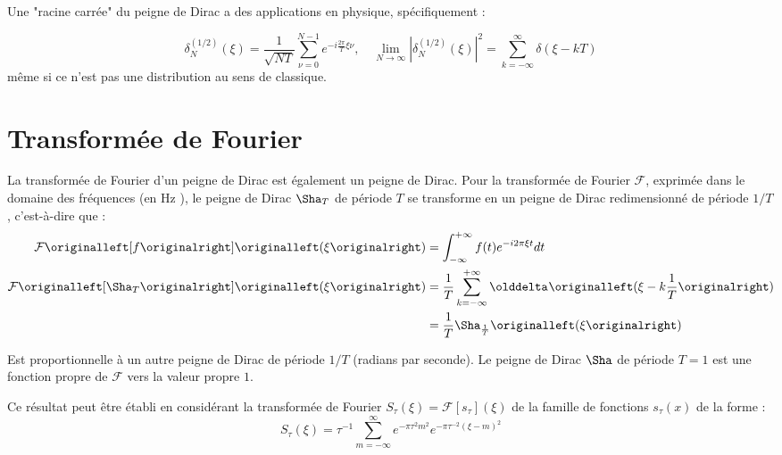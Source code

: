 Une "racine carr\'ee" du peigne de Dirac a des applications en physique, sp\'ecifiquement :

\[
    \delta_N^{(1 / 2)}(\xi) = \frac{1}{\sqrt{NT}} \sum_{\nu=0}^{N-1} e^{-i \frac{2\pi}{T}\xi \nu}, \quad 
\lim_{N \rightarrow \infty}\left|\delta_N^{(1 / 2)}(\xi)\right|^2= \sum_{k=-\infty}^{\infty} \delta(\xi - kT)
\]
m\^eme si ce n'est pas une distribution au sens de classique.

\section{Transformée de Fourier}

La transformée de Fourier d’un peigne de Dirac est également un peigne de Dirac. 
Pour la transformée de Fourier \(\mathcal{F}\), exprimée dans le domaine des 
fréquences (en \si{\hertz} ), le peigne de Dirac \(\Sha_T\) de période \(T\) se 
transforme en un peigne de Dirac redimensionné de période \(1/T\), c’est-à-dire que :
\begin{align*}
    \mathcal{F}\left[f\right]\left(\xi\right) &= \int_{-\infty}^{+\infty} f(t) e^{-i 2 \pi \xi t} dt\\
    \mathcal{F}\left[\Sha_T\right]\left(\xi\right) &= \frac{1}{T}\sum_{k=-\infty}^{+\infty} \delta\left(\xi - k\frac{1}{T}\right)\\
    &= \frac{1}{T}\Sha_\frac{1}{T}\left(\xi\right)
\end{align*}

Est proportionnelle à un autre peigne de Dirac de période \(1/T\) (radians par seconde).
Le peigne de Dirac \(\Sha\) de période \(T=1\) est une fonction propre de \(\mathcal{F}\) 
vers la valeur propre \(1\).

Ce résultat peut être établi en considérant la transformée de Fourier 
\(S_\tau\left(\xi\right)=\mathcal{F}\left[s_\tau\right]\left(\xi\right)\) de la famille
de fonctions \(s_\tau(x)\) de la forme :
\[
    S_{\tau}(\xi) = \tau^{-1}  \sum_{m=-\infty}^{\infty}  e^{-\pi \tau^2 m^2} e^{-\pi \tau^{-2} ( \xi-m)^{2} }
\]
